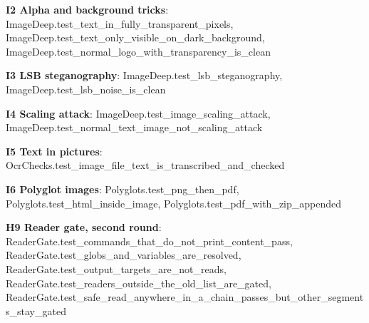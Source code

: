 \documentclass[10pt,a4paper]{article}
\begin{document}
\textbf{I2 Alpha and background tricks}: \textcolor{ok}{ImageDeep.\allowbreak{}test\_\allowbreak{}text\_\allowbreak{}in\_\allowbreak{}fully\_\allowbreak{}transparent\_\allowbreak{}pixels}, \textcolor{ok}{ImageDeep.\allowbreak{}test\_\allowbreak{}text\_\allowbreak{}only\_\allowbreak{}visible\_\allowbreak{}on\_\allowbreak{}dark\_\allowbreak{}background}, \textcolor{ok}{ImageDeep.\allowbreak{}test\_\allowbreak{}normal\_\allowbreak{}logo\_\allowbreak{}with\_\allowbreak{}transparency\_\allowbreak{}is\_\allowbreak{}clean}\par
\textbf{I3 LSB steganography}: \textcolor{ok}{ImageDeep.\allowbreak{}test\_\allowbreak{}lsb\_\allowbreak{}steganography}, \textcolor{ok}{ImageDeep.\allowbreak{}test\_\allowbreak{}lsb\_\allowbreak{}noise\_\allowbreak{}is\_\allowbreak{}clean}\par
\textbf{I4 Scaling attack}: \textcolor{ok}{ImageDeep.\allowbreak{}test\_\allowbreak{}image\_\allowbreak{}scaling\_\allowbreak{}attack}, \textcolor{ok}{ImageDeep.\allowbreak{}test\_\allowbreak{}normal\_\allowbreak{}text\_\allowbreak{}image\_\allowbreak{}not\_\allowbreak{}scaling\_\allowbreak{}attack}\par
\textbf{I5 Text in pictures}: \textcolor{ok}{OcrChecks.\allowbreak{}test\_\allowbreak{}image\_\allowbreak{}file\_\allowbreak{}text\_\allowbreak{}is\_\allowbreak{}transcribed\_\allowbreak{}and\_\allowbreak{}checked}\par
\textbf{I6 Polyglot images}: \textcolor{ok}{Polyglots.\allowbreak{}test\_\allowbreak{}png\_\allowbreak{}then\_\allowbreak{}pdf}, \textcolor{ok}{Polyglots.\allowbreak{}test\_\allowbreak{}html\_\allowbreak{}inside\_\allowbreak{}image}, \textcolor{ok}{Polyglots.\allowbreak{}test\_\allowbreak{}pdf\_\allowbreak{}with\_\allowbreak{}zip\_\allowbreak{}appended}\par
\textbf{H9 Reader gate, second round}: \textcolor{ok}{ReaderGate.\allowbreak{}test\_\allowbreak{}commands\_\allowbreak{}that\_\allowbreak{}do\_\allowbreak{}not\_\allowbreak{}print\_\allowbreak{}content\_\allowbreak{}pass}, \textcolor{ok}{ReaderGate.\allowbreak{}test\_\allowbreak{}globs\_\allowbreak{}and\_\allowbreak{}variables\_\allowbreak{}are\_\allowbreak{}resolved}, \textcolor{ok}{ReaderGate.\allowbreak{}test\_\allowbreak{}output\_\allowbreak{}targets\_\allowbreak{}are\_\allowbreak{}not\_\allowbreak{}reads}, \textcolor{ok}{ReaderGate.\allowbreak{}test\_\allowbreak{}readers\_\allowbreak{}outside\_\allowbreak{}the\_\allowbreak{}old\_\allowbreak{}list\_\allowbreak{}are\_\allowbreak{}gated}, \textcolor{ok}{ReaderGate.\allowbreak{}test\_\allowbreak{}safe\_\allowbreak{}read\_\allowbreak{}anywhere\_\allowbreak{}in\_\allowbreak{}a\_\allowbreak{}chain\_\allowbreak{}passes\_\allowbreak{}but\_\allowbreak{}other\_\allowbreak{}segments\_\allowbreak{}stay\_\allowbreak{}gated}\par
\end{document}
